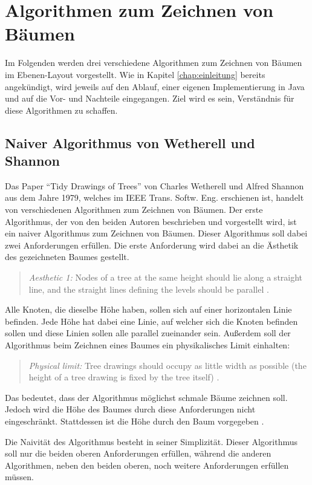 \chapter{Algorithmen zum Zeichnen von Bäumen}
\label{chap:kapitel3}
Im Folgenden werden drei verschiedene Algorithmen zum Zeichnen von Bäumen im Ebenen-Layout vorgestellt. Wie in Kapitel \ref{chap:einleitung}
bereits angekündigt, wird jeweils auf den Ablauf, einer eigenen Implementierung in Java und auf die Vor- und Nachteile eingegangen. Ziel wird
es sein, Verständnis für diese Algorithmen zu schaffen.

\section{Naiver Algorithmus von Wetherell und Shannon}

Das Paper “Tidy Drawings of Trees” von Charles Wetherell und Alfred Shannon aus dem Jahre 1979, 
welches im IEEE Trans. Softw. Eng. erschienen ist, handelt von verschiedenen Algorithmen zum Zeichnen von Bäumen\cite[]{q1}.
Der erste Algorithmus, der von den beiden Autoren beschrieben und vorgestellt wird, ist ein naiver Algorithmus 
zum Zeichnen von Bäumen. Dieser Algorithmus soll dabei zwei Anforderungen erfüllen. Die erste Anforderung wird dabei
an die Ästhetik des gezeichneten Baumes gestellt. 
\begin{quotation}
	\textit{Aesthetic 1:} Nodes of a tree at the same height should lie
	along a straight line, and the straight lines defining the levels
	should be parallel \cite[]{q1}.
\end{quotation}
Alle Knoten, die dieselbe Höhe haben, sollen sich auf einer horizontalen
Linie befinden. Jede Höhe hat dabei eine Linie, auf welcher sich die Knoten befinden sollen und diese Linien sollen alle
parallel zueinander sein. Außerdem soll der Algorithmus beim Zeichnen eines Baumes ein physikalisches Limit einhalten:
\begin{quotation}
	\textit{Physical limit:} Tree drawings should occupy as little width
	as possible (the height of a tree drawing is fixed by the tree
	itself) \cite[]{q1}.
\end{quotation}
Das bedeutet, dass der Algorithmus möglichst schmale Bäume zeichnen soll. Jedoch wird die Höhe des Baumes durch diese Anforderungen
nicht eingeschränkt. Stattdessen ist die Höhe durch den Baum vorgegeben \cite[]{q1}.

Die Naivität des Algorithmus besteht in seiner Simplizität. Dieser Algorithmus soll nur die beiden oberen Anforderungen erfüllen,
während die anderen Algorithmen, neben den beiden oberen, noch weitere Anforderungen erfüllen müssen.  

